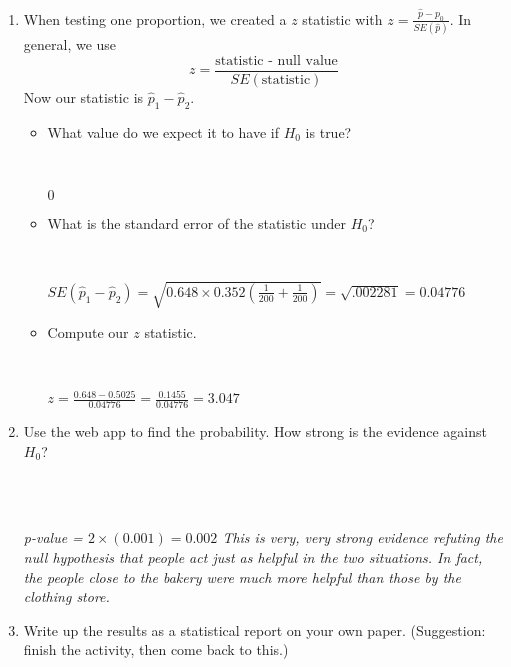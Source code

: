 \begin{enumerate}
\item When testing one proportion, we created a $z$ statistic with
$z = \frac{\widehat{p} - p_0}{SE(\widehat{p})}$.  In general, we use
$$ z = \frac{\mbox{statistic - null value}}{SE(\mbox{statistic})}$$
Now our statistic is $\widehat{p}_1 - \widehat{p}_2$.  
\begin{itemize}
\item What value do we expect it to have if $H_0$ is true?
\begin{students}
 \vspace{1cm}\\
\end{students}
\begin{key}
  $0$ \\
\end{key}
\item What is the standard error of the statistic under $H_0$?
\begin{students}
 \vspace{1cm}\\
\end{students}

\begin{key}
  $SE(\widehat{p}_1 - \widehat{p}_2 ) = \sqrt{ 0.648\times 0.352
    (\frac{1}{200} +  \frac{1}{200})} = \sqrt{.002281} = 0.04776$ 
\end{key}

\item Compute our $z$ statistic.
\begin{students}
 \vspace{1cm}\\
\end{students}
\begin{key}
 $z = \frac{ 0.648 - 0.5025}{0.04776} = \frac{0.1455}{0.04776} = 3.047$ \\
\end{key}  
\end{itemize}
\item Use the web app to find the probability.  
How strong is the evidence against $H_0$?
\begin{students}
 \vspace{1cm}\\
\end{students}
\begin{key}
  \\ {\it p-value = $2 \times(0.001) = 0.002$ This is very, very
    strong evidence refuting the null hypothesis that people act just
    as helpful in the two situations.  In fact, the people close to
    the bakery were much more helpful than those by the clothing
    store.  }
\end{key}

\item Write up the results as a statistical report on your own paper.
  (Suggestion:  finish the activity, then come back to this.) 
\begin{students}
 \vspace{1cm}
\end{students}

  \end{enumerate}

